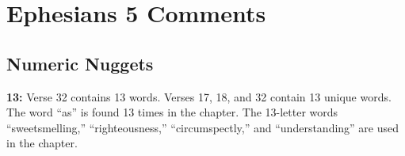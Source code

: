 \section{Ephesians 5 Comments}

\subsection{Numeric Nuggets}
\textbf{13:} Verse 32 contains 13 words. Verses 17, 18, and 32 contain 13 unique words. The word ``as'' is found 13 times in the chapter. The 13-letter words ``sweetsmelling,'' ``righteousness,'' ``circumspectly,'' and ``understanding'' are used in the chapter.